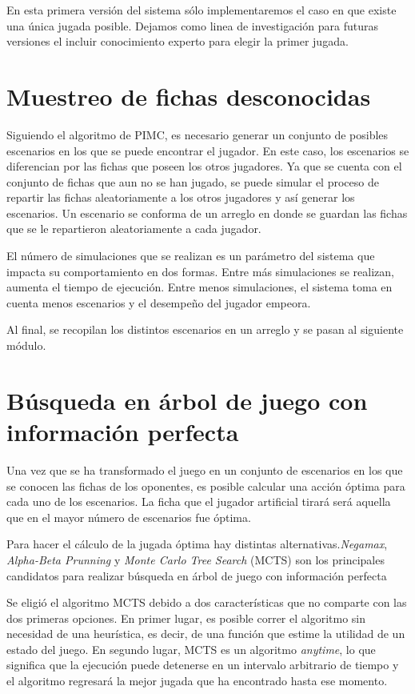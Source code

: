 En esta primera versión del sistema sólo implementaremos el caso en que existe
una única jugada posible. Dejamos como linea de investigación para futuras
versiones el incluir conocimiento experto para elegir la primer jugada.

\section{Muestreo de fichas desconocidas}

Siguiendo el algoritmo de PIMC, es necesario generar un conjunto de posibles
escenarios en los que se puede encontrar el jugador. En este caso, los
escenarios se diferencian por las fichas que poseen los otros jugadores. Ya que
se cuenta con el conjunto de fichas que aun no se han jugado, se puede simular
el proceso de repartir las fichas aleatoriamente a los otros jugadores y así
generar los escenarios. Un escenario se conforma de un arreglo en donde se
guardan las fichas que se le repartieron aleatoriamente a cada jugador.

El número de simulaciones que se realizan es un parámetro del sistema que
impacta su comportamiento en dos formas. Entre más simulaciones se realizan,
aumenta el tiempo de ejecución. Entre menos simulaciones, el sistema toma en
cuenta menos escenarios y el desempeño del jugador empeora.

Al final, se recopilan los distintos escenarios en un arreglo y se pasan al
siguiente módulo.

\section{Búsqueda en árbol de juego con información perfecta}

Una vez que se ha transformado el juego en un conjunto de escenarios en los que
se conocen las fichas de los oponentes, es posible calcular una acción óptima
para cada uno de los escenarios. La ficha que el jugador artificial tirará será
aquella que en el mayor número de escenarios fue óptima.

Para hacer el cálculo de la jugada óptima hay distintas
alternativas.\textit{Negamax}, \textit{Alpha-Beta Prunning} y \textit{Monte
   Carlo Tree Search} (MCTS) son los principales candidatos para realizar búsqueda
en árbol de juego con información perfecta

Se eligió el algoritmo MCTS debido a dos características que no comparte con las
dos primeras opciones. En primer lugar, es posible correr el algoritmo sin
necesidad de una heurística, es decir, de una función que estime la utilidad de
un estado del juego. En segundo lugar, MCTS es un algoritmo \textit{anytime}, lo
que significa que la ejecución puede detenerse en un intervalo arbitrario de
tiempo y el algoritmo regresará la mejor jugada que ha encontrado hasta ese
momento.

